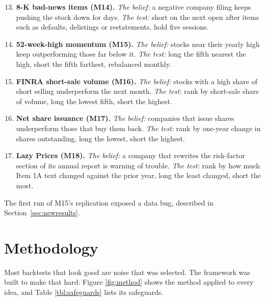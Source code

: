 \documentclass[11pt,a4paper]{article}
\providecommand{\tightlist}{\setlength{\itemsep}{0pt}\setlength{\parskip}{0pt}}
\begin{document}
\begin{enumerate}
\setcounter{enumi}{12}
\tightlist
\item
  \textbf{8-K bad-news items (M14).} \emph{The belief:} a negative company filing keeps pushing the stock down for days.
  \emph{The test:} short on the next open after items such as defaults, delistings or restatements, hold five sessions.
\item
  \textbf{52-week-high momentum (M15).} \emph{The belief:} stocks near their yearly high keep outperforming those far below it.
  \emph{The test:} long the fifth nearest the high, short the fifth farthest, rebalanced monthly.
\item
  \textbf{FINRA short-sale volume (M16).} \emph{The belief:} stocks with a high share of short selling underperform the next
  month. \emph{The test:} rank by short-sale share of volume, long the lowest fifth, short the highest.
\item
  \textbf{Net share issuance (M17).} \emph{The belief:} companies that issue shares underperform those that buy them back.
  \emph{The test:} rank by one-year change in shares outstanding, long the lowest, short the highest.
\item
  \textbf{Lazy Prices (M18).} \emph{The belief:} a company that rewrites the risk-factor section of its annual report is warning of
  trouble. \emph{The test:} rank by how much Item 1A text changed against the prior year, long the least changed, short the most.
\end{enumerate}

The first run of M15's replication exposed a data bug, described in Section~\ref{sec:newresults}.

\section{Methodology}\label{sec:method}

Most backtests that look good are noise that was selected. The framework was built to make that hard: Figure \ref{fig:method} shows the
method applied to every idea, and Table \ref{tbl:safeguards} lists its safeguards.
\end{document}
